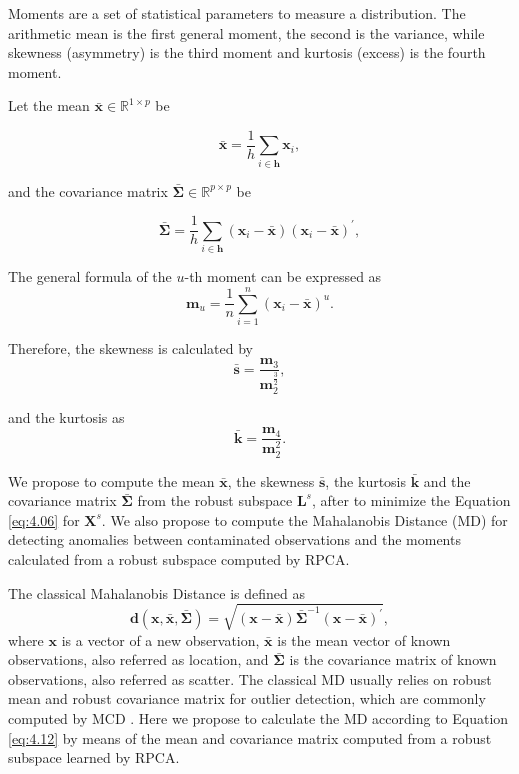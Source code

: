 Moments are a set of statistical parameters to measure a distribution. The arithmetic mean is the first general moment, the second is the variance, while skewness (asymmetry) is the third moment and kurtosis (excess) is the fourth moment.

Let the mean $\bar{\pmb{x}} \in \mathbb{R}^{1 \times p}$ be

\begin{equation}\label{eq:4.07}
	\bar{\pmb{x}} = \displaystyle\frac{1}{h}\displaystyle\sum_{i\in \pmb{h}} \pmb{x}_i, 
\end{equation}

and the covariance matrix $\bar{\pmb{\Sigma}} \in \mathbb{R}^{p \times p}$ be

\begin{equation}\label{eq:4.08}
	\bar{\pmb{\Sigma}} = \displaystyle\frac{1}{h}\displaystyle\sum_{i\in \pmb{h}} (\pmb{x}_i - \bar{\pmb{x}})(\pmb{x}_i - \bar{\pmb{x}})^\prime,
\end{equation}

The general formula of the $u$-th moment can be expressed as
\begin{equation}\label{eq:4.09}
	\pmb{m}_u = \displaystyle\frac{1}{n}\displaystyle\sum_{i = 1}^{n}(\pmb{x}_i - \bar{\pmb{x}})^u.
\end{equation}

Therefore, the skewness is calculated by
\begin{equation}\label{eq:4.10}
	\bar{\pmb{s}} = \frac{\pmb{m}_3}{\pmb{m}_2^{\frac{3}{2}}},
\end{equation}

and the kurtosis as
\begin{equation}\label{eq:4.11}
	\bar{\pmb{k}} = \frac{\pmb{m}_4}{\pmb{m}_2^2}.
\end{equation}

We propose to compute the mean $\bar{\pmb{x}}$, the skewness $\bar{\pmb{s}}$, the kurtosis $\bar{\pmb{k}}$ and the covariance matrix $\bar{\pmb{\Sigma}}$ from the robust subspace $\pmb{L}^s$, after to minimize the Equation \ref{eq:4.06} for $\pmb{X}^s$. We also propose to compute the Mahalanobis Distance (MD) for detecting anomalies between contaminated observations and the moments calculated from a robust subspace computed by RPCA. 

The classical Mahalanobis Distance is defined as		
\begin{equation}\label{eq:4.12}
	\pmb{d}(\pmb{x},\bar{\pmb{x}}, \bar{\pmb{\Sigma}}) = \sqrt{(\pmb{x} - \bar{\pmb{x}}) \bar{\pmb{\Sigma}}^{-1}(\pmb{x} - \bar{\pmb{x}})^\prime},
\end{equation}
where $\pmb{x}$ is a vector of a new observation, $\bar{\pmb{x}}$ is the mean vector of known observations, also referred as location, and $\bar{\pmb{\Sigma}}$ is the covariance matrix of known observations, also referred as scatter. The classical MD usually relies on robust mean and robust covariance matrix for outlier detection, which are commonly computed by MCD \cite{rousseeuw1984mcd, rousseeuw1999fastmcd}. Here we propose to calculate the MD according to Equation \ref{eq:4.12} by means of the mean and covariance matrix computed from a robust subspace learned by RPCA. 

